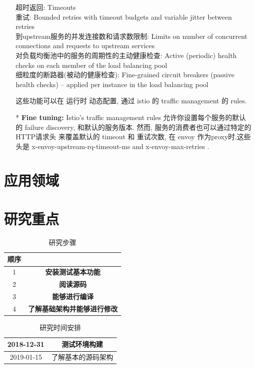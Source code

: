 \documentclass{ctexart}
\begin{document}
\begin{enumerate}
	超时返回: Timeouts\\
	重试: Bounded retries with timeout budgets and variable jitter between retries\\
	到upstream服务的并发连接数和请求数限制: Limits on number of concurrent connections and requests to upstream services\\
	对负载均衡池中的服务的周期性的主动健康检查: Active (periodic) health checks on each member of the load balancing pool\\
	细粒度的断路器(被动的健康检查): Fine-grained circuit breakers (passive health checks) – applied per instance in the load balancing pool
	
	这些功能可以在 运行时 动态配置, 通过 istio 的 traffic management 的 rules.
	
	\item [*] \textbf{Fine tuning:}
	Istio’s traffic management rules 允许你设置每个服务的默认的 failure discovery, 和默认的服务版本.
	然而, 服务的消费者也可以通过特定的HTTP请求头 来覆盖默认的 timeout 和 重试次数, 在 envoy 作为proxy时,这些头是 x-envoy-upstream-rq-timeout-ms and x-envoy-max-retries .
	
	

\end{enumerate}

\section{应用领域}

\section{研究重点}



\begin{table}[h]
	\centering
	\caption{研究步骤}
	\begin{tabular}{|c|c|}
		\hline
		顺序 & \\\hline
		1 & \textbf{安装测试基本功能} \\\hline
		2 & \textbf{阅读源码} \\\hline
		3 & \textbf{能够进行编译} \\\hline
		4 & \textbf{了解基础架构并能够进行修改} \\\hline
	\end{tabular}
\end{table}

\begin{table}[h]
	\centering
	\caption{研究时间安排}
	\begin{tabular}{|c|c|}
		\hline
		2018-12-31 & 测试环境构建 \\\hline
		2019-01-15 & 了解基本的源码架构 \\\hline
	\end{tabular}
\end{table}
\end{document}
